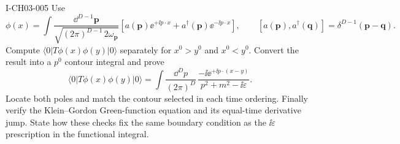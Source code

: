 \begin{exercise}{I-CH03-005}
Use
\[
 \phi(x)=\int\frac{\dd^{D-1}\mathbf p}{\sqrt{(2\pi)^{D-1}\,2\omega_{\mathbf p}}}
 \left[a(\mathbf p)\ee^{+\ii p\mathbin{\cdot}x}+a^\dagger(\mathbf p)\ee^{-\ii p\mathbin{\cdot}x}\right],
 \qquad [a(\mathbf p),a^\dagger(\mathbf q)]=\delta^{D-1}(\mathbf p-\mathbf q).
\]
Compute
\(\langle0|T\phi(x)\phi(y)|0\rangle\) separately for $x^0>y^0$ and
$x^0<y^0$.  Convert the result into a $p^0$ contour integral and prove
\[
 \langle0|T\phi(x)\phi(y)|0\rangle
 =\int\frac{\dd^D p}{(2\pi)^D}\,
 \frac{-\ii\ee^{+\ii p\mathbin{\cdot}(x-y)}}{p^2+m^2-\ii\varepsilon}.
\]
Locate both poles and match the contour selected in each time ordering.
Finally verify the Klein--Gordon Green-function equation and its equal-time
derivative jump.  State how these checks fix the same boundary condition as
the $\ii\varepsilon$ prescription in the functional integral.
\end{exercise}
